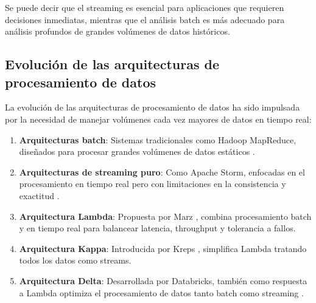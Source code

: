 Se puede decir que el streaming es esencial para aplicaciones
que requieren decisiones inmediatas, mientras que el análisis batch es más 
adecuado para análisis profundos de grandes volúmenes de datos históricos.\parencite{stonebraker2005one}
\newpage
\subsection{Evolución de las arquitecturas de procesamiento de datos}

La evolución de las arquitecturas de procesamiento de datos ha sido impulsada por la necesidad de manejar volúmenes cada vez mayores de datos en tiempo real:

\begin{enumerate}
    \item \textbf{Arquitecturas batch}: Sistemas tradicionales como Hadoop MapReduce, diseñados para procesar grandes volúmenes de datos estáticos \parencite{dean2008mapreduce}.
    \item \textbf{Arquitecturas de streaming puro}: Como Apache Storm, enfocadas en el procesamiento en tiempo real pero con limitaciones en la consistencia y exactitud \parencite{toshniwal2014storm}.
    \item \textbf{Arquitectura Lambda}: Propuesta por Marz \parencite{marz2011cap}, combina procesamiento batch y en tiempo real para balancear latencia, throughput y tolerancia a fallos.
    \item \textbf{Arquitectura Kappa}: Introducida por Kreps \parencite{kreps2014questioning}, simplifica Lambda tratando todos los datos como streams.
    \item \textbf{Arquitectura Delta}: Desarrollada por Databricks, también como respuesta a Lambda optimiza el procesamiento de datos tanto batch como streaming \parencite{deltalake} \parencite{delta}.
\end{enumerate}
\newpage